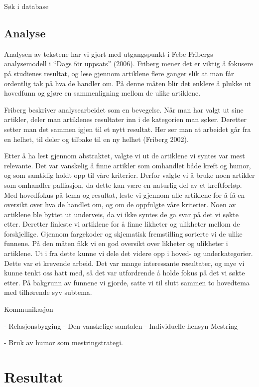 	Søk i database
	
\section{Analyse}

Analysen av tekstene har vi gjort med utgangspunkt i Febe Fribergs
analysemodell i “Dags för uppsats” (2006). Friberg mener det er viktig å
fokusere på studienes resultat, og lese gjennom artiklene flere ganger slik at
man får ordentlig tak på hva de handler om. På denne måten blir det enklere å
plukke ut hovedfunn og gjøre en sammenligning mellom de ulike artiklene.

Friberg beskriver analysearbeidet som en bevegelse. Når man har valgt ut sine
artikler, deler man artiklenes resultater inn i de kategorien man søker.
Deretter setter man det sammen igjen til et nytt resultat. Her ser man at
arbeidet går fra en helhet, til deler og tilbake til en ny helhet (Friberg
2002).

Etter å ha lest gjennom abstraktet, valgte vi ut de artiklene vi syntes var
mest relevante. Det var vanskelig å finne artikler som omhandlet både kreft og
humor, og som samtidig holdt opp til våre kriterier. Derfor valgte vi å bruke
noen artikler som omhandler palliasjon, da dette kan være en naturlig del av et
kreftforløp. Med hovedfokus på tema og resultat, leste vi gjennom alle
artiklene for å få en oversikt over hva de handlet om, og om de oppfulgte våre
kriterier. Noen av artiklene ble byttet ut underveis, da vi ikke syntes de ga
svar på det vi søkte etter. Deretter finleste vi artiklene for å finne likheter
og ulikheter mellom de forskjellige. Gjennom fargekoder og skjematisk
fremstilling sorterte vi de ulike funnene. På den måten fikk vi en god oversikt
over likheter og ulikheter i artiklene. Ut i fra dette kunne vi dele det videre
opp i hoved- og underkategorier. Dette var et krevende arbeid. Det var mange
interessante resultater, og mye vi kunne tenkt oss hatt med, så det var
utfordrende å holde fokus på det vi søkte etter. På bakgrunn av funnene vi
gjorde, satte vi til slutt sammen to  hovedtema med tilhørende syv subtema. 

Kommunikasjon
 
	-         Relasjonsbygging
-         Den vanskelige samtalen 
-         Individuelle hensyn
	Mestring
 
	-         Bruk av humor som 
          mestringstrategi. 

\chapter{Resultat}

